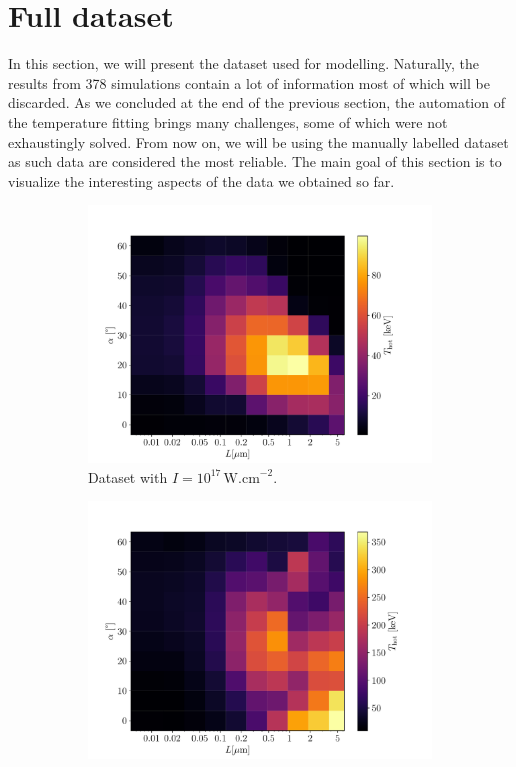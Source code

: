 \section{Full dataset}
In this section, we will present the dataset used for modelling. Naturally, the results from 378 simulations contain a lot of information most of which will be discarded. As we concluded at the end of the previous section, the automation of the temperature fitting brings many challenges, some of which were not exhaustingly solved. From now on, we will be using the manually labelled dataset as such data are considered the most reliable. The main goal of this section is to visualize the interesting aspects of the data we obtained so far.
\begin{figure}[ht]
	\centering
	\begin{subfigure}{0.49\textwidth}
		\centering
		\includegraphics[width=\textwidth]{figures/I_1e17t_hot}
		\caption{Dataset with $I = 10^{17} \, \mathrm{W.cm}^{-2}$.}
		\label{fig:dataset1-a}
	\end{subfigure}
	\hfill
	\begin{subfigure}{0.49\textwidth}
		\centering
		\includegraphics[width=\textwidth]{figures/I_1e18t_hot}

\end{subfigure}
\end{figure}
